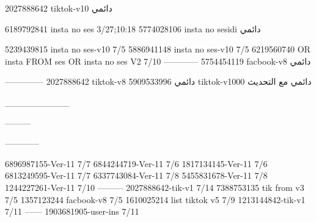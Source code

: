 2027888642 tiktok-v10
دائمي

6189792841 insta no ses
3/27;10:18
5774028106 insta no sesidi
دائمي

5239439815 insta no ses-v10
7/5
5886941148 insta no ses-v10
7/5
6219560740 OR insta FROM ses OR insta no ses V2
7/10
------------
5754454119 facbook-v8
دائمي


--------------
2027888642 tiktok-v8
دائمي
5909533996 tiktok-v1000
دائمي مع التحديث

__________

---------

------------

6896987155-Ver-11
7/7
6844244719-Ver-11
7/6
1817134145-Ver-11
7/6
6813249595-Ver-11
7/7
6337743084-Ver-11
7/8
5455831678-Ver-11
7/8
1244227261-Ver-11
7/10
---------
2027888642-tik-v1
7/14
7388753135 tik from v3
7/5
1357123244 facbook-v8
7/5
1610025214 list tiktok v5
7/9
1213144842-tik-v1
7/11
------
1903681905-user-ins
7/11
